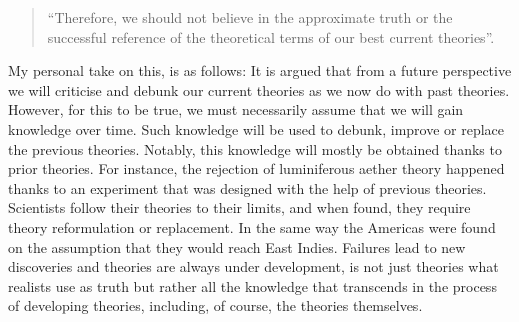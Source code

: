 \documentclass[
]{book}
\begin{document}
\begin{quote}
``Therefore, we should not believe in the approximate truth or the successful reference of the theoretical terms of our best current theories''.
\end{quote}

My personal take on this, is as follows: It is argued that from a future perspective we will criticise and debunk our current theories as we now do with past theories. However, for this to be true, we must necessarily assume that we will gain knowledge over time. Such knowledge will be used to debunk, improve or replace the previous theories. Notably, this knowledge will mostly be obtained thanks to prior theories. For instance, the rejection of luminiferous aether theory happened thanks to an experiment that was designed with the help of previous theories. Scientists follow their theories to their limits, and when found, they require theory reformulation or replacement. In the same way the Americas were found on the assumption that they would reach East Indies. Failures lead to new discoveries and theories are always under development, is not just theories what realists use as truth but rather all the knowledge that transcends in the process of developing theories, including, of course, the theories themselves.

  
\end{document}
